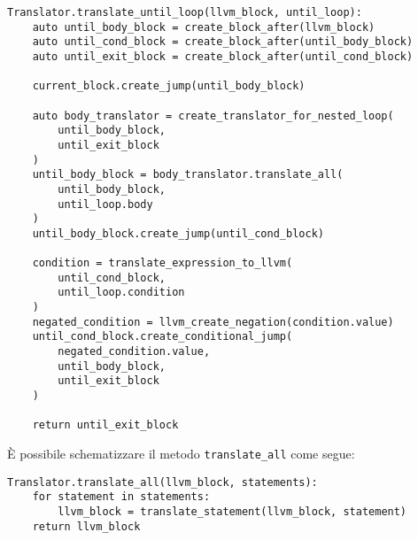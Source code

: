 \vspace{0.5cm}
\begin{lstlisting}[frame=single]
Translator.translate_until_loop(llvm_block, until_loop):
    auto until_body_block = create_block_after(llvm_block)
    auto until_cond_block = create_block_after(until_body_block)
    auto until_exit_block = create_block_after(until_cond_block)
    
    current_block.create_jump(until_body_block)

    auto body_translator = create_translator_for_nested_loop(
        until_body_block, 
        until_exit_block
    )
    until_body_block = body_translator.translate_all(
        until_body_block,
        until_loop.body
    )
    until_body_block.create_jump(until_cond_block)

    condition = translate_expression_to_llvm(
        until_cond_block, 
        until_loop.condition
    )
    negated_condition = llvm_create_negation(condition.value)
    until_cond_block.create_conditional_jump(
        negated_condition.value, 
        until_body_block, 
        until_exit_block
    )

    return until_exit_block  
\end{lstlisting}
\vspace{0.5cm}

È possibile schematizzare il metodo \texttt{translate\_all} come segue: \\

\vspace{0.5cm}
\begin{lstlisting}[frame=single]
Translator.translate_all(llvm_block, statements):
    for statement in statements: 
        llvm_block = translate_statement(llvm_block, statement)
    return llvm_block
\end{lstlisting}
\vspace{0.5cm}

\newpage